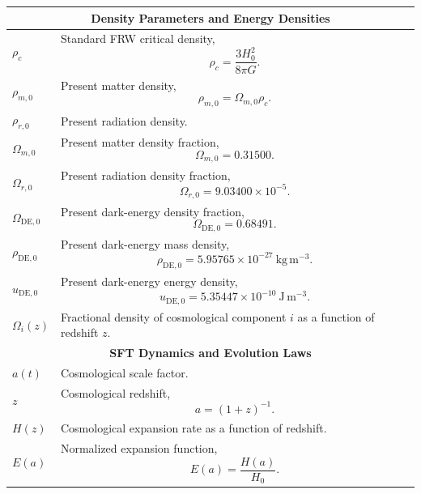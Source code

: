 \documentclass[12pt]{article}
\begin{document}
\begin{longtable}{p{}p{}}

\multicolumn{2}{c}{\textbf{Density Parameters and Energy Densities}}\\
\hline

$\rho_c$ & Standard FRW critical density,
\[
\rho_c=\frac{3H_0^2}{8\pi G}.
\]\\

$\rho_{m,0}$ & Present matter density,
\[
\rho_{m,0}=\Omega_{m,0}\rho_c.
\]\\

$\rho_{r,0}$ & Present radiation density.\\

$\Omega_{m,0}$ & Present matter density fraction,
\[
\Omega_{m,0}=0.31500.
\]\\

$\Omega_{r,0}$ & Present radiation density fraction,
\[
\Omega_{r,0}=9.03400\times10^{-5}.
\]\\

$\Omega_{\mathrm{DE},0}$ & Present dark-energy density fraction,
\[
\Omega_{\mathrm{DE},0}=0.68491.
\]\\

$\rho_{\mathrm{DE},0}$ & Present dark-energy mass density,
\[
\rho_{\mathrm{DE},0}
=
5.95765\times10^{-27}~\mathrm{kg\,m^{-3}}.
\]\\

$u_{\mathrm{DE},0}$ & Present dark-energy energy density,
\[
u_{\mathrm{DE},0}
=
5.35447\times10^{-10}~\mathrm{J\,m^{-3}}.
\]\\

$\Omega_i(z)$ & Fractional density of cosmological component $i$ as a function of redshift $z$.\\


\multicolumn{2}{c}{\textbf{SFT Dynamics and Evolution Laws}}\\
\hline

$a(t)$ & Cosmological scale factor.\\

$z$ & Cosmological redshift,
\[
a=(1+z)^{-1}.
\]\\

$H(z)$ & Cosmological expansion rate as a function of redshift.\\

$E(a)$ & Normalized expansion function,
\[
E(a)=\frac{H(a)}{H_0}.
\]\\


\end{longtable}
\end{document}
